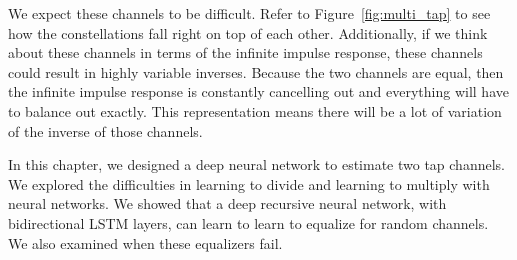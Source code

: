 We expect these channels to be difficult.  Refer to Figure~\ref{fig:multi_tap} to see how the constellations fall right on top of each other.
Additionally, if we think about these channels in terms of the infinite impulse response, these channels could result in highly variable inverses.  Because the two channels are equal, then the infinite impulse response is constantly cancelling out and everything will have to balance out exactly.  This representation means there will be a lot of variation of the inverse of those channels.

In this chapter, we designed a deep neural network to estimate two tap channels.
We explored the difficulties in learning to divide and learning to multiply with neural networks. We showed that a deep recursive neural network, with bidirectional LSTM layers, can learn to learn to equalize for random channels.  We also examined when these equalizers fail. 